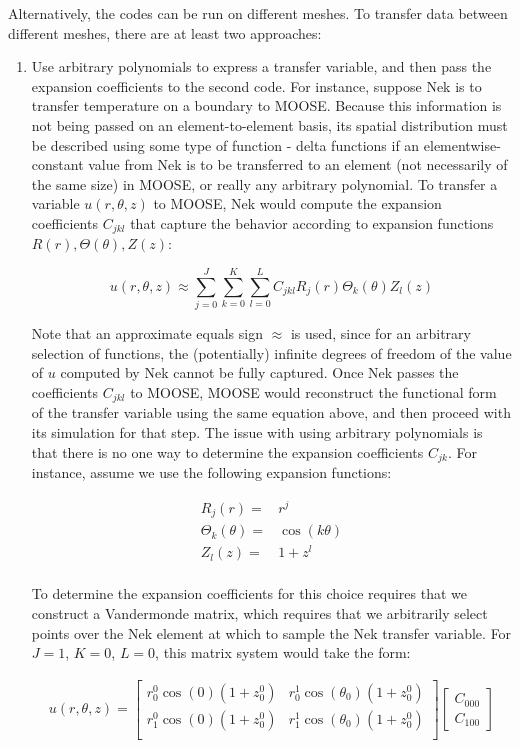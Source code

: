 \documentclass[10pt]{article}
\newcommand{\beq}{\begin{equation}}
\newcommand{\eeq}{\end{equation}}
\newcommand{\beqa}{\begin{equation}\begin{aligned}}
\newcommand{\eeqa}{\end{aligned}\end{equation}}
\numberwithin{equation}{section} %
\begin{document}
Alternatively, the codes can be run on different meshes. To transfer data between different meshes, there are at least two approaches:

\begin{enumerate}
\item Use arbitrary polynomials to express a transfer variable, and then pass the expansion coefficients to the second code. For instance, suppose Nek is to transfer temperature on a boundary to MOOSE. Because this information is not being passed on an element-to-element basis, its spatial distribution must be described using some type of function - delta functions if an elementwise-constant value from Nek is to be transferred to an element (not necessarily of the same size) in MOOSE, or really any arbitrary polynomial. To transfer a variable \(u(r, \theta, z)\) to MOOSE, Nek would compute the expansion coefficients \(C_{jkl}\) that capture the behavior according to expansion functions \(R(r), \Theta(\theta), Z(z)\):
	
	\beq
	\label{eq:GenericExpansion}
	u(r, \theta, z)\approx\sum_{j=0}^J\sum_{k=0}^K\sum_{l=0}^L C_{jkl}R_j(r)\Theta_k(\theta)Z_l(z)
	\eeq
	
Note that an approximate equals sign \(\approx\) is used, since for an arbitrary selection of functions, the (potentially) infinite degrees of freedom of the value of \(u\) computed by Nek cannot be fully captured. Once Nek passes the coefficients \(C_{jkl}\) to MOOSE, MOOSE would reconstruct the functional form of the transfer variable using the same equation above, and then proceed with its simulation for that step. The issue with using arbitrary polynomials is that there is no one way to determine the expansion coefficients \(C_{jk}\). For instance, assume we use the following expansion functions:

	\beqa
	R_j(r)=&r^j\\
	\Theta_k(\theta)=&\cos(k\theta)\\
	Z_l(z)=&1+z^l\\
	\eeqa

To determine the expansion coefficients for this choice requires that we construct a Vandermonde matrix, which requires that we arbitrarily select points over the Nek element at which to sample the Nek transfer variable. For \(J=1\), \(K=0\), \(L=0\), this matrix system would take the form:

\beqa
u(r,\theta,z)=\begin{bmatrix}
r_0^0\cos{(0)}(1+z_0^0) & r_0^1\cos{(\theta_0)}(1+z_0^0)\\
r_1^0\cos{(0)}(1+z_0^0) & r_1^1\cos{(\theta_0)}(1+z_0^0)\\
\end{bmatrix}
\begin{bmatrix}
C_{000}\\C_{100}
\end{bmatrix}
\eeqa


\end{enumerate}
\end{document}
